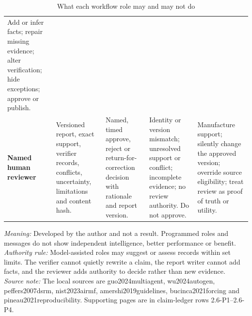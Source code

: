 \begin{table}[p]
\begin{tabularx}{\textwidth}{@{}P{0.145\textwidth}P{0.185\textwidth}P{0.19\textwidth}Y P{0.19\textwidth}@{}}
    Add or infer facts; repair missing evidence; alter verification; hide exceptions; approve or publish. \\
    \addlinespace
    \textbf{Named human reviewer} &
    Versioned report, exact support, verifier records, conflicts, uncertainty, limitations and content hash. &
    Named, timed approve, reject or return-for-correction decision with rationale and report version. &
    Identity or version mismatch; unresolved support or conflict; incomplete evidence; no review authority. Do not approve. &
    Manufacture support; silently change the approved version; override source eligibility; treat review as proof of truth or utility. \\
    \bottomrule
  \end{tabularx}

  \caption{What each workflow role may and may not do}
  \label{tab:lit-role-authority-matrix}
  \vspace{3pt}

  \parbox{\textwidth}{\scriptsize
    \textit{Meaning:} Developed by the author and not a result. Programmed roles and messages do not show independent intelligence, better performance or benefit.\\
    \textit{Authority rule:} Model-assisted roles may suggest or assess records within set limits. The verifier cannot quietly rewrite a claim, the report writer cannot add facts, and the reviewer adds authority to decide rather than new evidence.\\
    \textit{Source note:} The local sources are guo2024multiagent, wu2024autogen, peffers2007dsrm, nist2023airmf, amershi2019guidelines, bucinca2021forcing and pineau2021reproducibility. Supporting pages are in claim-ledger rows 2.6-P1--2.6-P4.
  }
\end{table}
\clearpage
